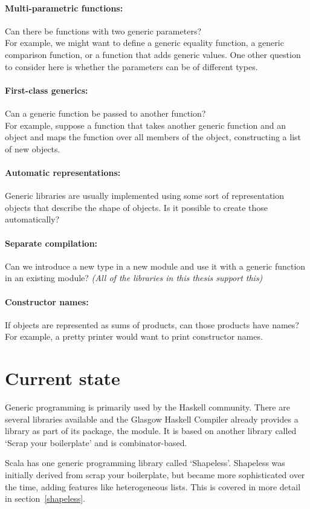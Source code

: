 \paragraph{Multi-parametric functions:} Can there be functions with two generic parameters?
\\
For example, we might want to define a generic equality function, a generic
comparison function, or a function that adds generic values. One other question
to consider here is whether the parameters can be of different types.

\paragraph{First-class generics:} Can a generic function be passed to another function?
\\
For example, suppose a function  that takes another generic function 
and an object and maps the function  over all members of the object, constructing
a list of new objects.

\paragraph{Automatic representations:} Generic libraries are usually implemented
using some sort of representation objects that describe the shape of
objects. Is it possible to create those automatically?

\paragraph{Separate compilation:} Can we introduce a new type in a new module
and use it with a generic function in an existing module?
\textit{(All of the libraries in this thesis support this)}


\paragraph{Constructor names:} If objects are represented as sums of products,
can those products have names?
For example, a pretty printer would want to print constructor names.


\section*{Current state}
Generic programming is primarily used by the Haskell community. There are
several libraries available and the Glasgow Haskell Compiler already provides
a library as part of its  package, the  module. It
is based on another library called `Scrap your boilerplate'\cite{DBLP:conf/tldi/LammelJ03}
and is combinator-based.

Scala has one generic programming library called `Shapeless'. Shapeless was
initially derived from scrap your boilerplate, but became more sophisticated
over the time, adding features like heterogeneous lists. This is covered
in more detail in section~\ref{shapeless}.
